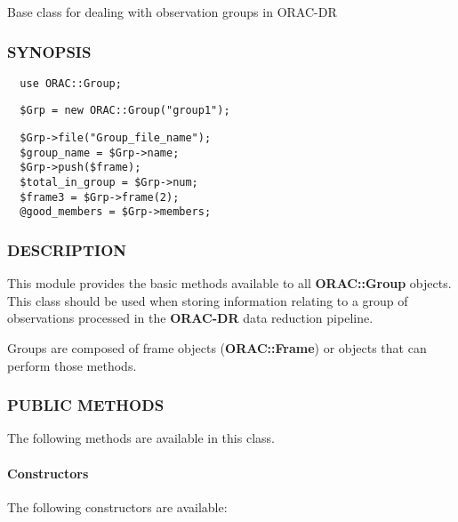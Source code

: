 Base class for dealing with observation groups in ORAC-DR

\subsubsection*{SYNOPSIS\label{ORAC::Group_SYNOPSIS}}\begin{verbatim}
  use ORAC::Group;
\end{verbatim}
\begin{verbatim}
  $Grp = new ORAC::Group("group1");
\end{verbatim}
\begin{verbatim}
  $Grp->file("Group_file_name");
  $group_name = $Grp->name;
  $Grp->push($frame);
  $total_in_group = $Grp->num;
  $frame3 = $Grp->frame(2);
  @good_members = $Grp->members;
\end{verbatim}
\subsubsection*{DESCRIPTION\label{ORAC::Group_DESCRIPTION}}

This module provides the basic methods available to all
\textbf{ORAC::Group} objects. This class should be used when 
storing information relating to a group of observations
processed in the \textbf{ORAC-DR} data reduction pipeline.



Groups are composed of frame objects (\textbf{ORAC::Frame})
or objects that can perform those methods.

\subsubsection*{PUBLIC METHODS\label{ORAC::Group_PUBLIC_METHODS}}

The following methods are available in this class.

\paragraph*{Constructors\label{ORAC::Group_Constructors}}

The following constructors are available:

